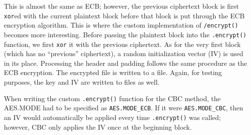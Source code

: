 \documentclass[11pt]{article}
\begin{document}
This is almost the same as ECB; however, the previous ciphertext block is first \verb|xor|ed with the current plaintext block before that block is put through the ECB encryption algorithm. This is where the custom implementation of \verb|/encrypt()| becomes more interesting. Before passing the plaintext block into the \verb|.encrypt()| function, we first \verb|xor| it with the previous ciphertext. As for the very first block (which has no ``previous'' ciphertext), a random initialization vector (IV) is used in its place. Processing the header and padding follows the same procedure as the ECB encryption. The encrypted file is written to a file. Again, for testing purposes, the key and IV are written to files as well.

When writing the custom \verb|.encrypt()| function for the CBC method, the AES.MODE had to be specified as \verb|AES.MODE_ECB|. If it were \verb|AES.MODE_CBC|, then an IV would automatically be applied every time \verb|.encrypt()| was called; however, CBC only applies the IV once at the beginning block.
\end{document}
